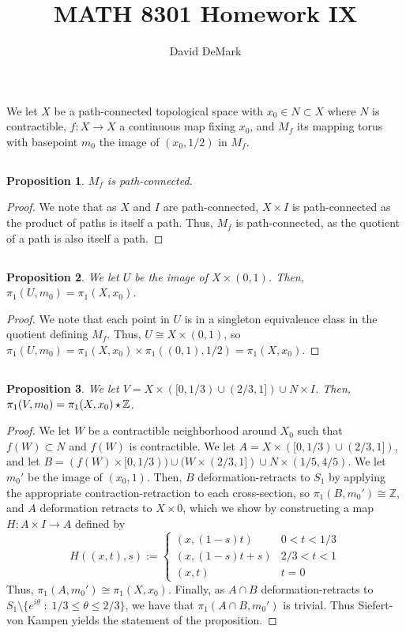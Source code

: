 \documentclass[english]{article}
\title{MATH 8301 Homework IX}
\author{David DeMark}
\date{\due}
\newcommand{\ZZ}{\mathbb{Z}}
\newcommand{\prob}[1]{\setcounter{section}{#1-1}\section{}}
\newcommand{\prt}[1]{\setcounter{subsection}{#1-1}\subsection{}}
\newtheorem*{proposition*}{Proposition}
\theoremstyle{remark}
\theoremstyle{definition}
\newcommand{\frp}{\mathop{\large {\mathlarger{\star}}}}
\begin{document}
\maketitle
\prob{1} We let $X$ be a path-connected topological space with $x_0\in N\subset X$ where $N$ is contractible, $f:X\to X$ a continuous map fixing $x_0$, and $M_f$ its mapping torus with basepoint $m_0$ the image of $(x_0,1/2)$ in $M_f$.  
\prt{1}
\begin{proposition*}
	$M_f$ is path-connected. 
\end{proposition*}
\begin{proof}
	We note that as $X$ and $I$ are path-connected, $X\times I$ is path-connected as the product of paths is itself a path. Thus, $M_f$ is path-connected, as the quotient of a path is also itself a path.
\end{proof}
\prt{2}\begin{proposition*}
	We let $U$ be the image of $X\times (0,1)$. Then, $\pi_{1}(U,m_0)=\pi_1(X,x_0)$. 
\end{proposition*}
\begin{proof}
	We note that each point in $U$ is in a singleton equivalence class in the quotient defining $M_f$. Thus, $U\cong X\times (0,1)$, so $\pi_1(U,m_0)=\pi_1(X,x_0)\times \pi_1((0,1),1/2)=\pi_1(X,x_0)$.
\end{proof}
\prt{3} \begin{proposition*}
	We let $V=X\times ([0,1/3)\cup (2/3,1])\cup N\times I$. Then, $\pi_1(V,m_0)=\pi_1(X,x_0)\frp \ZZ$. 
\end{proposition*}
\begin{proof}
	We let $W$ be a contractible neighborhood around $X_0$ such that $f(W)\subset N$ and $f(W)$ is contractible. We let $A=X\times ([0,1/3)\cup (2/3,1])$, and let $B=(f(W)\times [0,1/3))\cup (W\times (2/3,1] )\cup N\times (1/5,4/5)$. We let $m_0'$ be the image of $(x_0,1)$. Then, $B$ deformation-retracts to $S_1$ by applying the appropriate contraction-retraction to each cross-section, so $\pi_1(B,m_0')\cong\ZZ$, and $A$ deformation retracts to $X\times {0}$, which we show by constructing a map $H:A\times I\to A$ defined by \begin{equation*}
		H((x,t),s):=\begin{cases}
		(x,(1-s)t) & 0<t<1/3\\
		(x,(1-s)t+s)& 2/3<t<1\\
		(x,t)&t=0
		\end{cases}
	\end{equation*} 
	Thus, $\pi_1(A,m_0')\cong\pi_1(X,x_0)$. Finally, as $A\cap B$ deformation-retracts to $S_1\setminus \{e^{i\theta}\;:\;1/3\leq \theta \leq2/3\}$, we have that $\pi_1(A\cap B,m_0')$ is trivial. Thus Siefert-von Kampen yields the statement of the proposition. 
\end{proof}
\end{document}
